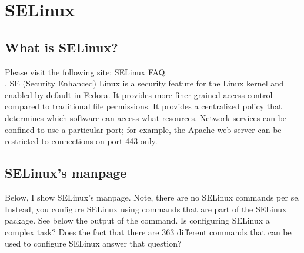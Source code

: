 \chapter{SELinux}
\label{ch:selinux}
\pagestyle{fancy}

\fancyhf{} %
\fancyhead[OC]{\leftmark} %
\setlength{\headheight}{13.99pt} 
\cfoot{\thepage} %
		

\section{What is SELinux?}

Please visit the following site: \href{https://fedoraproject.org/wiki/SELinux_FAQ}{SELinux FAQ}.\\

, SE (Security Enhanced) Linux is a security feature for the Linux kernel and enabled by default in Fedora. It provides more finer grained access control compared to traditional file permissions. It provides a centralized policy that determines which software can access what resources. Network services can be confined to use a particular port; for example, the Apache web server can be restricted to connections on port 443 only.

\section{SELinux's manpage}

Below, I show SELinux's manpage. Note, there are no SELinux commands per se. Instead, you configure SELinux using commands that are part of the SELinux package. See below the output of the  command. Is configuring SELinux a complex task? Does the fact that there are 363 different commands that can be used to configure SELinux answer that question?

